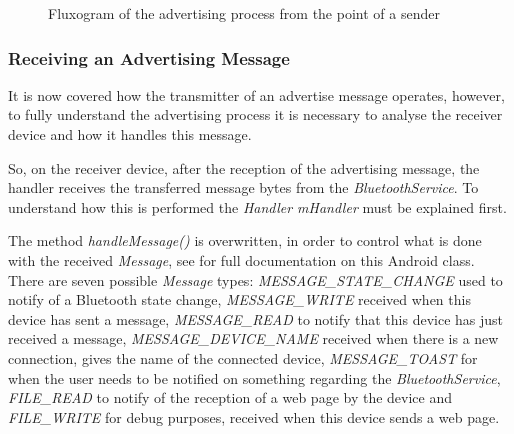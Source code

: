 \begin{figure}[ht]
   \noindent{}
	\caption{\label{fig:advflux} Fluxogram of the advertising process from the point of a sender}
\end{figure}

\subsubsection{Receiving an Advertising Message}
\label{subsubsec:rcvadv}

It is now covered how the transmitter of an advertise message operates, however, to fully understand the advertising process it is necessary to analyse the receiver device and how it handles this message.

So, on the receiver device, after the reception of the advertising message, the handler receives the transferred message bytes from the \textit{BluetoothService}. To understand how this is performed the \textit{Handler mHandler} must be explained first.

The method \textit{handleMessage()} is overwritten, in order to control what is done with the received \textit{Message}, see \cite{msgclass} for full documentation on this Android class. There are seven possible \textit{Message} types: \textit{MESSAGE\_STATE\_CHANGE} used to notify of a Bluetooth state change, \textit{MESSAGE\_WRITE} received when this device has sent a message, \textit{MESSAGE\_READ} to notify that this device has just received a message, \textit{MESSAGE\_DEVICE\_NAME} received when there is a new connection, gives the name of the connected device, \textit{MESSAGE\_TOAST} for when the user needs to be notified on something regarding the \textit{BluetoothService}, \textit{FILE\_READ} to notify of the reception of a web page by the device and \textit{FILE\_WRITE} for debug purposes, received when this device sends a web page.


